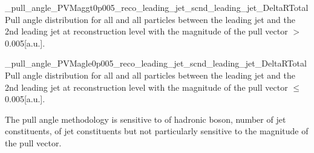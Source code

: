           {_pull_angle_PVMaggt0p005_reco_leading_jet_scnd_leading_jet_DeltaRTotal}
          {Pull angle distribution for all \DeltaR and all particles between the leading jet and the 2nd leading jet at reconstruction level with the magnitude of the pull vector $> $0.005[a.u.].}

          {_pull_angle_PVMagle0p005_reco_leading_jet_scnd_leading_jet_DeltaRTotal}
          {Pull angle distribution for all \DeltaR and all particles between the leading jet and the 2nd leading jet at reconstruction level with the magnitude of the pull vector $\leq $0.005[a.u.].}

The pull angle methodology is sensitive to \pt of hadronic \PW boson, number of jet constituents, \pt of jet constituents but not particularly sensitive to the magnitude of the pull vector.

%





